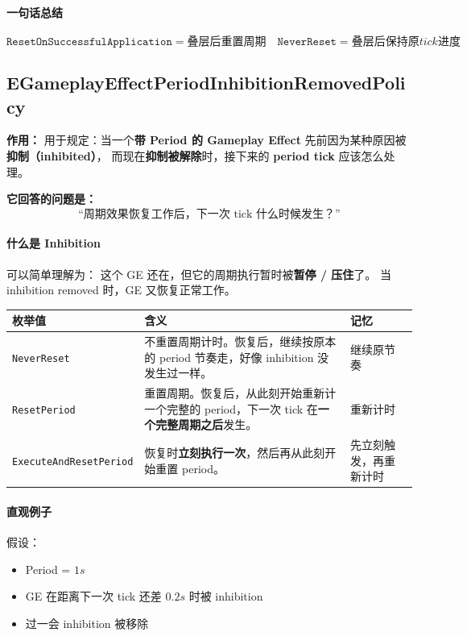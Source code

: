 \documentclass[CJKmath=true,10pt]{MyBook}
\begin{document}
\paragraph{一句话总结}
\[
\boxed{
	\texttt{ResetOnSuccessfulApplication} = 叠层后重置周期
	\quad
	\texttt{NeverReset} = 叠层后保持原 tick 进度
}
\]


\subsection{EGameplayEffectPeriodInhibitionRemovedPolicy}

\textbf{作用：}  
用于规定：当一个\textbf{带 Period 的 Gameplay Effect} 先前因为某种原因被\textbf{抑制（inhibited）}，  
而现在\textbf{抑制被解除}时，接下来的 \textbf{period tick} 应该怎么处理。

\vspace{0.5em}
\textbf{它回答的问题是：}
\[
\text{“周期效果恢复工作后，下一次 tick 什么时候发生？”}
\]

\paragraph{什么是 Inhibition}
可以简单理解为：  
这个 GE 还在，但它的周期执行暂时被\textbf{暂停 / 压住}了。  
当 inhibition removed 时，GE 又恢复正常工作。

\begin{longtable}{@{}p{}p{}p{}@{}}
	\toprule
	\textbf{枚举值} & \textbf{含义} & \textbf{记忆} \\
	\midrule
	\endhead
	
	\texttt{NeverReset}
	&
	不重置周期计时。恢复后，继续按原本的 period 节奏走，好像 inhibition 没发生过一样。
	&
	继续原节奏
	\\
	
	\texttt{ResetPeriod}
	&
	重置周期。恢复后，从此刻开始重新计一个完整的 period，下一次 tick 在\textbf{一个完整周期之后}发生。
	&
	重新计时
	\\
	
	\texttt{ExecuteAndResetPeriod}
	&
	恢复时\textbf{立刻执行一次}，然后再从此刻开始重置 period。
	&
	先立刻触发，再重新计时
	\\
	
	\bottomrule
\end{longtable}

\paragraph{直观例子}
假设：
\begin{itemize}
	\item Period = $1s$
	\item GE 在距离下一次 tick 还差 $0.2s$ 时被 inhibition
	\item 过一会 inhibition 被移除
\end{itemize}
\end{document}
